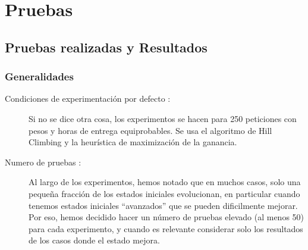 \documentclass{article}
\begin{document}
\newpage

\section{Pruebas}

\subsection{Pruebas realizadas y Resultados}

\subsubsection{Generalidades}

\begin{description}
\item[Condiciones de experimentación por defecto :] Si no se dice otra cosa, los
experimentos se hacen para 250 peticiones con pesos y horas de entrega
equiprobables. Se usa el algoritmo de Hill Climbing y la heurística de
maximización de la ganancia.
\item[Numero de pruebas :] Al largo de los experimentos, hemos notado que en
muchos casos, solo una pequeña fracción de los estados iniciales evolucionan, en
particular cuando tenemos estados iniciales ``avanzados'' que se pueden
dificilmente mejorar. Por eso, hemos decidido hacer un número de pruebas elevado
(al menos 50) para cada experimento, y cuando es relevante considerar solo los
resultados de los casos donde el estado mejora.
\end{description}
\end{document}
